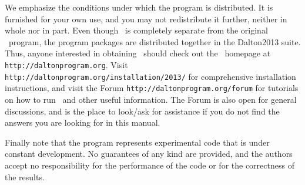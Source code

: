 \vspace{0.5 cm}

We emphasize the conditions under which the
program is distributed.  It is furnished for your own use,
and you may not redistribute it further, neither in whole nor in
part.  Even though \lsdalton\ is completely separate from the original
\dalton\ program, the program packages are distributed together in the
Dalton2013 suite. Thus, 
anyone interested in obtaining \lsdalton\ should check out the
\dalton\ homepage at
\verb|http://daltonprogram.org|. Visit \verb|http://daltonprogram.org/installation/2013/|
for comprehensive installation instructions, and visit the Forum
\verb|http://daltonprogram.org/forum| for 
tutorials on how to run \lsdalton\ and other 
useful information. The Forum is also open for general discussions, and 
is the place to look/ask for assistance if you do not find the answers 
you are looking for in this manual.

Finally note that the
program represents experimental code that is
under constant development.  No guarantees of any kind are
provided, and the authors accept no responsibility for the
performance of the code or for the correctness of the results.

